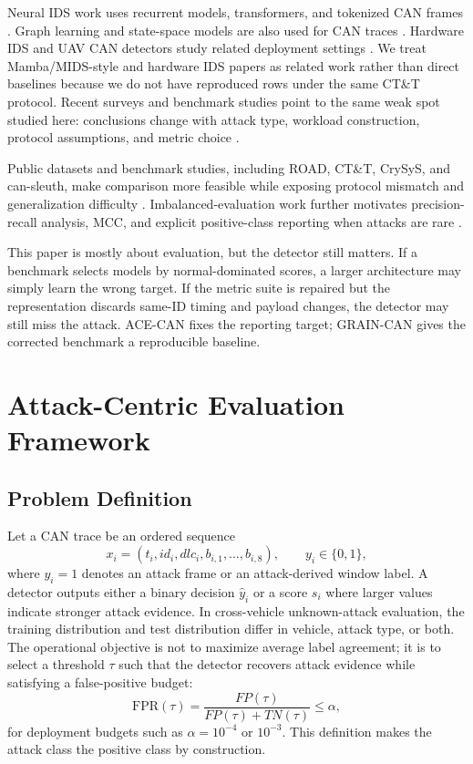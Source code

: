 \documentclass[runningheads]{llncs}%
\newcommand{\method}{GRAIN-CAN}
\newcommand{\framework}{ACE-CAN}
\begin{document}
Neural IDS work uses recurrent models, transformers, and tokenized CAN frames \cite{taylor2016frequency,kang2016survival,alkhatib2022canbert}.  Graph learning and state-space models are also used for CAN traces \cite{wang2023statgraph,liu2026mids}.  Hardware IDS and UAV CAN detectors study related deployment settings \cite{seccan2025,khandelsurvey2025,majumder2024uavcan}.  We treat Mamba/MIDS-style and hardware IDS papers as related work rather than direct baselines because we do not have reproduced rows under the same CT\&T protocol.  Recent surveys and benchmark studies point to the same weak spot studied here: conclusions change with attack type, workload construction, protocol assumptions, and metric choice \cite{althunayyan2025survey,sharmin2024benchmarking,guerra2024road}.

Public datasets and benchmark studies, including ROAD, CT\&T, CrySyS, and can-sleuth, make comparison more feasible while exposing protocol mismatch and generalization difficulty \cite{verma2020road,lampe2024ctt,gazdag2023crysys,kidmose2025cansleuth}.  Imbalanced-evaluation work further motivates precision-recall analysis, MCC, and explicit positive-class reporting when attacks are rare \cite{davis2006pr,saito2015pr,chicco2020mcc}.

This paper is mostly about evaluation, but the detector still matters.  If a benchmark selects models by normal-dominated scores, a larger architecture may simply learn the wrong target.  If the metric suite is repaired but the representation discards same-ID timing and payload changes, the detector may still miss the attack.  \framework{} fixes the reporting target; \method{} gives the corrected benchmark a reproducible baseline.

\section{Attack-Centric Evaluation Framework}
\subsection{Problem Definition}
Let a CAN trace be an ordered sequence
\begin{equation}
    x_i=(t_i, id_i, dlc_i, b_{i,1},\ldots,b_{i,8}), \qquad y_i\in\{0,1\},
\end{equation}
where $y_i=1$ denotes an attack frame or an attack-derived window label.  A detector outputs either a binary decision $\hat{y}_i$ or a score $s_i$ where larger values indicate stronger attack evidence.  In cross-vehicle unknown-attack evaluation, the training distribution and test distribution differ in vehicle, attack type, or both.  The operational objective is not to maximize average label agreement; it is to select a threshold $\tau$ such that the detector recovers attack evidence while satisfying a false-positive budget:
\begin{equation}
    \mathrm{FPR}(\tau)=\frac{FP(\tau)}{FP(\tau)+TN(\tau)} \leq \alpha,
\end{equation}
for deployment budgets such as $\alpha=10^{-4}$ or $10^{-3}$.  This definition makes the attack class the positive class by construction.
\end{document}
